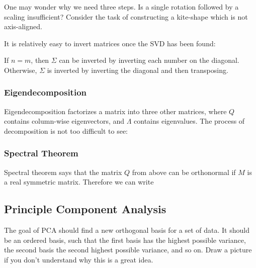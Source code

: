 \documentclass[12pt]{article}
\begin{document}
One may wonder why we need three steps. Is a single rotation followed by a scaling insufficient? Consider the task of constructing a kite-shape which is not axis-aligned.

It is relatively easy to invert matrices once the SVD has been found:


If $n = m$, then $\Sigma$ can be inverted by inverting each number on the diagonal. Otherwise, $\Sigma$ is inverted by inverting the diagonal and then transposing.

\subsubsection{Eigendecomposition}


Eigendecomposition factorizes a matrix into three other matrices, where $Q$ contains column-wise eigenvectors, and $\Lambda$ contains eigenvalues. The process of decomposition is not too difficult to see:


\subsubsection{Spectral Theorem}

Spectral theorem says that the matrix $Q$ from above can be orthonormal if $M$ is a real symmetric matrix. Therefore we can write


\subsection{Principle Component Analysis}

The goal of PCA should find a new orthogonal basis for a set of data. It should be an ordered basis, such that the first basis has the highest possible variance, the second basis the second highest possible variance, and so on. Draw a picture if you don't understand why this is a great idea. 
\end{document}
